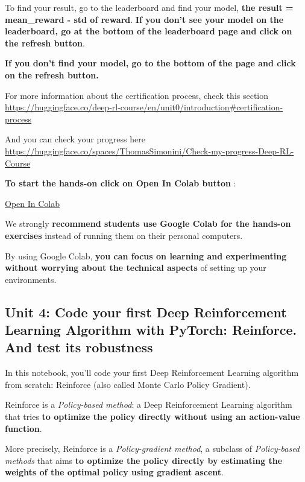 \documentclass[11pt,a4paper]{article}
\begin{document}
To find your result, go to the leaderboard and find your model, \textbf{the result = mean\_reward - std of reward}. \textbf{If you don't see your model on the leaderboard, go at the bottom of the leaderboard page and click on the refresh button}.

\textbf{If you don't find your model, go to the bottom of the page and click on the refresh button.}

For more information about the certification process, check this section \url{https://huggingface.co/deep-rl-course/en/unit0/introduction#certification-process}

And you can check your progress here \url{https://huggingface.co/spaces/ThomasSimonini/Check-my-progress-Deep-RL-Course}

\textbf{To start the hands-on click on Open In Colab button} :

\href{https://colab.research.google.com/github/huggingface/deep-rl-class/blob/master/notebooks/unit4/unit4.ipynb}{Open In Colab}

We strongly \textbf{recommend students use Google Colab for the hands-on exercises} instead of running them on their personal computers.

By using Google Colab, \textbf{you can focus on learning and experimenting without worrying about the technical aspects} of setting up your environments.

\subsection{Unit 4: Code your first Deep Reinforcement Learning Algorithm with PyTorch: Reinforce. And test its robustness}\label{unit-4-code-your-first-deep-reinforcement-learning-algorithm-with-pytorch-reinforce.-and-test-its-robustness}


In this notebook, you'll code your first Deep Reinforcement Learning algorithm from scratch: Reinforce (also called Monte Carlo Policy Gradient).

Reinforce is a \emph{Policy-based method}: a Deep Reinforcement Learning algorithm that tries \textbf{to optimize the policy directly without using an action-value function}.

More precisely, Reinforce is a \emph{Policy-gradient method}, a subclass of \emph{Policy-based methods} that aims \textbf{to optimize the policy directly by estimating the weights of the optimal policy using gradient ascent}.
\end{document}
